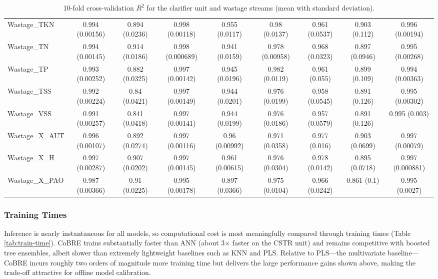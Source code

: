 \documentclass{article}
\begin{document}
\begin{table}[h]
\begin{tabular}{lcccccccc}
Wastage\_TKN & 0.994 (0.00156) & 0.894 (0.0236) & 0.998 (0.00118) & 0.955 (0.0117) & 0.98 (0.0137) & 0.961 (0.0537) & 0.903 (0.112) & 0.996 (0.00194) \\
Wastage\_TN & 0.994 (0.00145) & 0.914 (0.0186) & 0.998 (0.000689) & 0.941 (0.0159) & 0.978 (0.00958) & 0.968 (0.0323) & 0.897 (0.0946) & 0.995 (0.00268) \\
Wastage\_TP & 0.993 (0.00252) & 0.882 (0.0325) & 0.997 (0.00142) & 0.945 (0.0196) & 0.982 (0.0119) & 0.961 (0.055) & 0.899 (0.109) & 0.994 (0.00363) \\
Wastage\_TSS & 0.992 (0.00224) & 0.84 (0.0421) & 0.997 (0.00149) & 0.944 (0.0201) & 0.976 (0.0199) & 0.958 (0.0545) & 0.891 (0.126) & 0.995 (0.00302) \\
Wastage\_VSS & 0.991 (0.00257) & 0.841 (0.0418) & 0.997 (0.00141) & 0.944 (0.0199) & 0.976 (0.0186) & 0.957 (0.0579) & 0.891 (0.126) & 0.995 (0.003) \\
Wastage\_X\_AUT & 0.996 (0.00107) & 0.892 (0.0274) & 0.997 (0.00116) & 0.96 (0.00992) & 0.971 (0.0358) & 0.977 (0.016) & 0.903 (0.0699) & 0.997 (0.00079) \\
Wastage\_X\_H & 0.997 (0.00287) & 0.907 (0.0202) & 0.997 (0.00145) & 0.961 (0.00615) & 0.976 (0.0304) & 0.978 (0.0142) & 0.895 (0.0718) & 0.997 (0.000881) \\
Wastage\_X\_PAO & 0.987 (0.00366) & 0.91 (0.0225) & 0.995 (0.00178) & 0.897 (0.0366) & 0.975 (0.0104) & 0.966 (0.0242) & 0.861 (0.1) & 0.995 (0.0027) \\
\end{tabular}
\caption{10-fold cross-validation $R^{2}$ for the clarifier unit and wastage streams (mean with standard deviation).}
\label{tab:cv-clarifier}
\end{table}

\subsubsection{Training Times}

Inference is nearly instantaneous for all models, so computational cost is most meaningfully compared through training times (Table \ref{tab:train-time}). CoBRE trains substantially faster than ANN (about 3$\times$ faster on the CSTR unit) and remains competitive with boosted tree ensembles, albeit slower than extremely lightweight baselines such as KNN and PLS. Relative to PLS---the multivariate baseline---CoBRE incurs roughly two orders of magnitude more training time but delivers the large performance gains shown above, making the trade-off attractive for offline model calibration.
\end{document}
